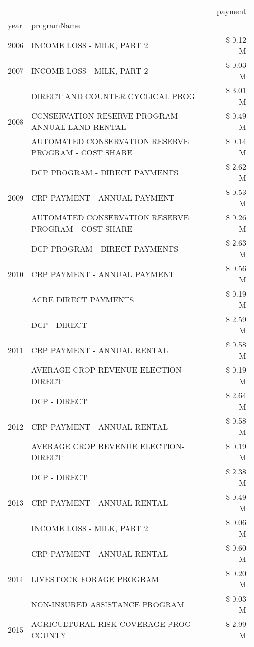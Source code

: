 \begin{tabular}{llr}
\toprule
 &  & payment \\
year & programName &  \\
\midrule
2006 & INCOME LOSS - MILK, PART 2 & \$ 0.12 M \\
\cline{1-3}
2007 & INCOME LOSS - MILK, PART 2 & \$ 0.03 M \\
\cline{1-3}
\multirow[t]{3}{*}{2008} & DIRECT AND COUNTER CYCLICAL PROG & \$ 3.01 M \\
 & CONSERVATION RESERVE PROGRAM - ANNUAL LAND RENTAL & \$ 0.49 M \\
 & AUTOMATED CONSERVATION RESERVE PROGRAM - COST SHARE & \$ 0.14 M \\
\cline{1-3}
\multirow[t]{3}{*}{2009} & DCP PROGRAM - DIRECT PAYMENTS & \$ 2.62 M \\
 & CRP PAYMENT - ANNUAL PAYMENT & \$ 0.53 M \\
 & AUTOMATED CONSERVATION RESERVE PROGRAM - COST SHARE & \$ 0.26 M \\
\cline{1-3}
\multirow[t]{3}{*}{2010} & DCP PROGRAM - DIRECT PAYMENTS & \$ 2.63 M \\
 & CRP PAYMENT - ANNUAL PAYMENT & \$ 0.56 M \\
 & ACRE DIRECT PAYMENTS & \$ 0.19 M \\
\cline{1-3}
\multirow[t]{3}{*}{2011} & DCP - DIRECT & \$ 2.59 M \\
 & CRP PAYMENT - ANNUAL RENTAL & \$ 0.58 M \\
 & AVERAGE CROP REVENUE ELECTION-DIRECT & \$ 0.19 M \\
\cline{1-3}
\multirow[t]{3}{*}{2012} & DCP - DIRECT & \$ 2.64 M \\
 & CRP PAYMENT - ANNUAL RENTAL & \$ 0.58 M \\
 & AVERAGE CROP REVENUE ELECTION-DIRECT & \$ 0.19 M \\
\cline{1-3}
\multirow[t]{3}{*}{2013} & DCP - DIRECT & \$ 2.38 M \\
 & CRP PAYMENT - ANNUAL RENTAL & \$ 0.49 M \\
 & INCOME LOSS - MILK, PART 2 & \$ 0.06 M \\
\cline{1-3}
\multirow[t]{3}{*}{2014} & CRP PAYMENT - ANNUAL RENTAL & \$ 0.60 M \\
 & LIVESTOCK FORAGE PROGRAM & \$ 0.20 M \\
 & NON-INSURED ASSISTANCE PROGRAM & \$ 0.03 M \\
\cline{1-3}
\multirow[t]{3}{*}{2015} & AGRICULTURAL RISK COVERAGE PROG - COUNTY & \$ 2.99 M \\

\end{tabular}
